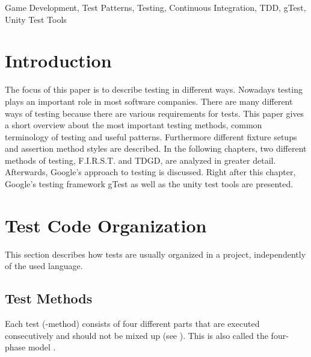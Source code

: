 \begin{keywords}
    Game Development, Test Patterns, Testing, Continuous Integration, TDD, gTest, Unity Test Tools
\end{keywords}

\section{Introduction} \label{sec:Introduction}
The focus of this paper is to describe testing in different ways. Nowadays testing plays an important role in most software companies. There are many different ways of testing because there are various requirements for tests. This paper gives a short overview about the most important testing methods, common terminology of testing and useful patterns. Furthermore different fixture setups and assertion method styles are described. In the following chapters, two different methods of testing, F.I.R.S.T. and TDGD, are analyzed in greater detail. Afterwards, Google's approach to testing is discussed. Right after this chapter, Google's testing framework gTest as well as the unity test tools are presented. 

\section{Test Code Organization} \label{sec:TestCodeOrganization}
    This section describes how tests are usually organized in a project, independently of the used language.

    \subsection{Test Methods}
        Each test (-method) consists of four different parts that are executed consecutively and should not be mixed up (see ).
        This is also called the four-phase model \citep{Meszaros:2006:XTP:1076526}.


